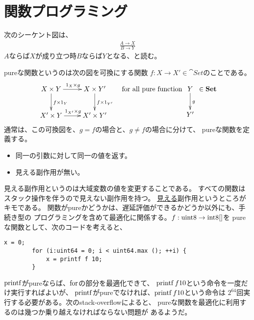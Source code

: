 {\section{関数プログラミング}\label{s1:関数プログラミング} %
	\begin{description}\setlength{\itemsep}{-1mm} %
		\item[シーケント図]	次のシーケント図は、
		\begin{equation*}\begin{split}
			\frac{A\to X}{B\to Y}
		\end{split}\end{equation*}
		$A$ならば$X$が成り立つ時$B$ならば$Y$となる、と読む。
		\item[pureな関数] pureな関数というのは次の図を可換にする関数
		$f:X\to X'\in\cat{Set}$のことである。
		\begin{equation*}\begin{split}
			\xymatrix{
				X\times Y \ar[r]^{1_X\times g} \ar[d]^{f\times 1_Y} 
				& X\times Y' \ar[d]^{f\times 1_{Y'}} \\
				X'\times Y \ar[r]^{1_{X'}\times g} & X'\times Y' \\
			} \quad\text{for all pure function }  \xymatrix{
				Y \ar[d]^g \\ Y'
			} \in\cat{Set}
		\end{split}\end{equation*}
		通常は、この可換図を、$g=f$の場合と、$g\neq f$の場合に分けて、
		pureな関数を定義する。
		\begin{itemize}\setlength{\itemsep}{-1mm} %
			\item 同一の引数に対して同一の値を返す。
			\item 見える副作用が無い。
		\end{itemize} %
		見える副作用というのは大域変数の値を変更することである。
		すべての関数はスタック操作を伴うので見えない副作用を持つ。
		\underline{見える}副作用というところがキモである。
		関数がpureかどうかは、遅延評価ができるかどうか以外にも、手続き型の
		プログラミングを含めて最適化に関係する。$f:\mathinner{\operatorname{uint8}}\to\mathinner{\operatorname{int8[]}}$を
		pureな関数として、次のコードを考えると、
		\begin{lstlisting}[caption=pure関数の最適化
		, label=code:pure関数の最適化]
		x = 0;
		for (i:uint64 = 0; i < uint64.max (); ++i) {
			x = printf f 10;
		}
		\end{lstlisting}
		$\mathinner{\operatorname{printf}}$がpureならば、$\mathinner{\operatorname{for}}$の部分を最適化できて、
		$\mathinner{\operatorname{printf}}f10$という命令を一度だけ実行すればよいが、
		$\mathinner{\operatorname{printf}}$がpureでなければ、$\mathinner{\operatorname{printf}}f10$という命令は
		$2^{64}$回実行する必要がある。次のstack-overflowによると、
		pureな関数を最適化に利用するのは幾つか乗り越えなければならない問題が
		あるようだ\cite{stackof:1363008}。
	\end{description} %
}
